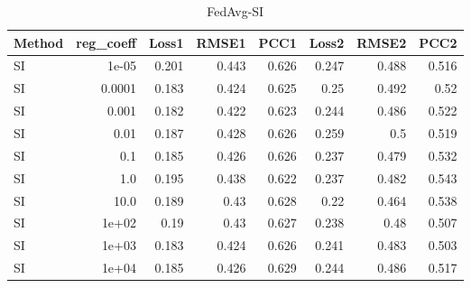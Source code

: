 \begin{table}
\caption{FedAvg-SI}
\begin{tabular}{lrrrrrrr}
\toprule
Method & reg_coeff & Loss1 & RMSE1 & PCC1 & Loss2 & RMSE2 & PCC2 \\
\midrule
SI & 1e-05 & 0.201 & 0.443 & 0.626 & 0.247 & 0.488 & 0.516 \\
SI & 0.0001 & 0.183 & 0.424 & 0.625 & 0.25 & 0.492 & 0.52 \\
SI & 0.001 & 0.182 & 0.422 & 0.623 & 0.244 & 0.486 & 0.522 \\
SI & 0.01 & 0.187 & 0.428 & 0.626 & 0.259 & 0.5 & 0.519 \\
SI & 0.1 & 0.185 & 0.426 & 0.626 & 0.237 & 0.479 & 0.532 \\
SI & 1.0 & 0.195 & 0.438 & 0.622 & 0.237 & 0.482 & 0.543 \\
SI & 10.0 & 0.189 & 0.43 & 0.628 & 0.22 & 0.464 & 0.538 \\
SI & 1e+02 & 0.19 & 0.43 & 0.627 & 0.238 & 0.48 & 0.507 \\
SI & 1e+03 & 0.183 & 0.424 & 0.626 & 0.241 & 0.483 & 0.503 \\
SI & 1e+04 & 0.185 & 0.426 & 0.629 & 0.244 & 0.486 & 0.517 \\
\bottomrule
\end{tabular}
\end{table}
